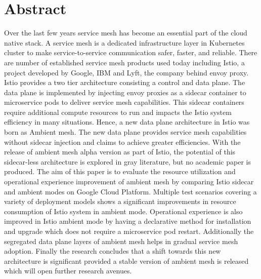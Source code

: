 \section*{Abstract}
Over the last few years service mesh has become an essential part of the cloud native stack. A service mesh is a dedicated infrastructure layer in Kubernetes cluster to make service-to-service communication safer, faster, and reliable. There are number of established service mesh products used today including Istio, a project developed by Google, IBM and Lyft, the company behind envoy proxy. Istio provides a two tier architecture consisting a control and data plane. The data plane is implemented by injecting envoy proxies as a sidecar container to microservice pods to deliver service mesh capabilities. This sidecar containers require additional compute resources to run and impacts the Istio system efficiency in many situations. Hence, a new data plane architecture in Istio was born as Ambient mesh. The new data plane provides service mesh capabilities without sidecar injection and claims to achieve greater efficiencies. With the release of ambient mesh alpha version as part of Istio, the potential of this sidecar-less architecture is explored in gray literature, but no academic paper is produced. The aim of this paper is to evaluate the resource utilization and operational experience improvement of ambient mesh by comparing Istio sidecar and ambient modes on Google Cloud Platform. Multiple test scenarios covering a variety of deployment models shows a significant improvements in resource consumption of Istio system in ambient mode. Operational experience is also improved in Istio ambient mode by having a declarative method for installation and upgrade which does not require a microservice pod restart. Additionally the segregated data plane layers of ambient mesh helps in gradual service mesh adoption. Finally the research concludes that a shift towards this new architecture is significant provided a stable version of ambient mesh is released which will open further research avenues.